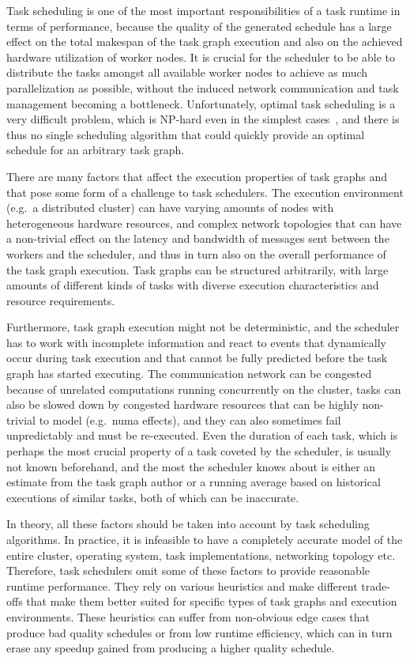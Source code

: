 Task scheduling is one of the most important responsibilities of a task runtime in terms of
performance, because the quality of the generated schedule has a large effect on the total makespan
of the task graph execution and also on the achieved hardware utilization of worker nodes. It is
crucial for the scheduler to be able to distribute the tasks amongst all available worker nodes to
achieve as much parallelization as possible, without the induced network communication and task
management becoming a bottleneck. Unfortunately, optimal task scheduling is a very difficult
problem, which is NP-hard even in the simplest cases~\cite{Ullman1975}, and there is thus no
single scheduling algorithm that could quickly provide an optimal schedule for an arbitrary task
graph.

There are many factors that affect the execution properties of task graphs and that pose some form
of a challenge to task schedulers. The execution environment (e.g.\ a distributed cluster) can have
varying amounts of nodes with heterogeneous hardware resources, and complex network topologies that
can have a non-trivial effect on the latency and bandwidth of messages sent between the workers and
the scheduler, and thus in turn also on the overall performance of the task graph execution. Task
graphs can be structured arbitrarily, with large amounts of different kinds of tasks with diverse
execution characteristics and resource requirements.

Furthermore, task graph execution might not be deterministic, and the scheduler has to work with
incomplete information and react to events that dynamically occur during task execution and that
cannot be fully predicted before the task graph has started executing. The communication network
can be congested because of unrelated computations running concurrently on the cluster, tasks can
also be slowed down by congested hardware resources that can be highly non-trivial to model (e.g.\
\gls{numa} effects), and they can also sometimes fail unpredictably and must be
re-executed. Even the duration of each task, which is perhaps the most crucial property of a task
coveted by the scheduler, is usually not known beforehand, and the most the scheduler knows about
is either an estimate from the task graph author or a running average based on historical
executions of similar tasks, both of which can be inaccurate.

In theory, all these factors should be taken into account by task scheduling algorithms. In
practice, it is infeasible to have a completely accurate model of the entire cluster, operating
system, task implementations, networking topology etc. Therefore, task schedulers omit some of
these factors to provide reasonable runtime performance. They rely on various heuristics and make
different trade-offs that make them better suited for specific types of task graphs and execution
environments. These heuristics can suffer from non-obvious edge cases that produce bad quality
schedules or from low runtime efficiency, which can in turn erase any speedup gained from producing
a higher quality schedule.

